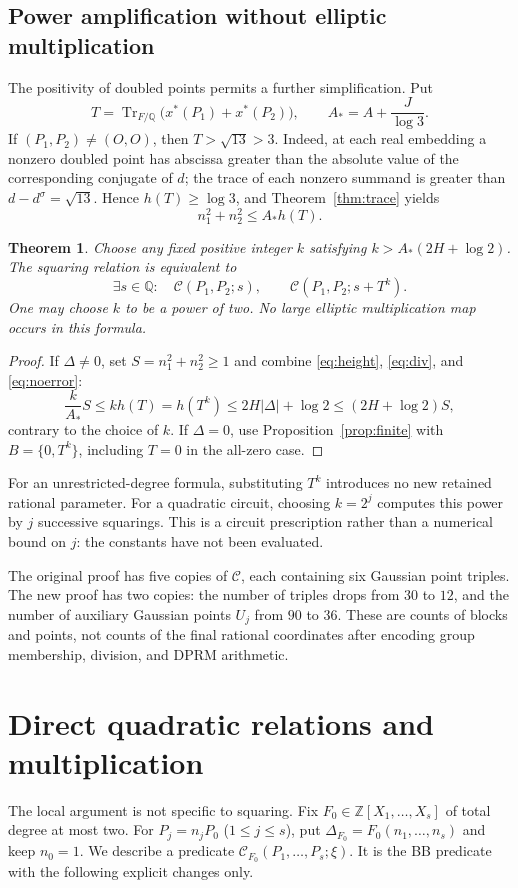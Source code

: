 \documentclass[11pt,a4paper]{article}
\newtheorem{theorem}{Theorem}[section]
\newcommand{\Q}{\mathbb Q}\newcommand{\Z}{\mathbb Z}
\DeclareMathOperator{\Tr}{Tr}\DeclareMathOperator{\Num}{Num}
\begin{document}
\subsection{Power amplification without elliptic multiplication}
The positivity of doubled points permits a further simplification.
Put
\[
 T=\Tr_{F/\Q}\bigl(x^*(P_1)+x^*(P_2)\bigr),\qquad
 A_*=A+\frac{J}{\log3}.
\]
If $(P_1,P_2)\ne(O,O)$, then $T>\sqrt{13}>3$. Indeed, at
each real embedding a nonzero doubled point has abscissa greater
than the absolute value of the corresponding conjugate of $d$;
the trace of each nonzero summand is greater than
$d-d^\sigma=\sqrt{13}$. Hence $h(T)\ge\log3$, and
Theorem~\ref{thm:trace} yields
\begin{equation}\label{eq:noerror}
 n_1^2+n_2^2\le A_* h(T).
\end{equation}

\begin{theorem}\label{thm:power}
Choose any fixed positive integer $k$ satisfying
$k>A_*(2H+\log2)$. The squaring relation is equivalent to
\[
 \exists s\in\Q:\quad
 \mathcal C(P_1,P_2;s),\qquad
 \mathcal C(P_1,P_2;s+T^k).
\]
One may choose $k$ to be a power of two. No large elliptic
multiplication map occurs in this formula.
\end{theorem}
\begin{proof}
If $\Delta\ne0$, set $S=n_1^2+n_2^2\ge1$ and combine
\eqref{eq:height}, \eqref{eq:div}, and \eqref{eq:noerror}:
\[
 \frac{k}{A_*}S\le k h(T)=h(T^k)
 \le 2H|\Delta|+\log2\le(2H+\log2)S,
\]
contrary to the choice of $k$. If $\Delta=0$, use
Proposition~\ref{prop:finite} with $B=\{0,T^k\}$, including
$T=0$ in the all-zero case.
\end{proof}

For an unrestricted-degree formula, substituting $T^k$ introduces
no new retained rational parameter. For a quadratic circuit,
choosing $k=2^j$ computes this power by $j$ successive squarings.
This is a circuit prescription rather than a numerical bound on $j$:
the constants have not been evaluated.

The original proof has five copies of $\mathcal C$, each containing
six Gaussian point triples. The new proof has two copies: the number
of triples drops from $30$ to $12$, and the number of auxiliary
Gaussian points $U_j$ from $90$ to $36$. These are counts of blocks
and points, not counts of the final rational coordinates after
encoding group membership, division, and DPRM arithmetic.

\section{Direct quadratic relations and multiplication}
The local argument is not specific to squaring. Fix
$F_0\in\Z[X_1,\ldots,X_s]$ of total degree at most two. For
$P_j=n_jP_0$ ($1\le j\le s$), put
$\Delta_{F_0}=F_0(n_1,\ldots,n_s)$ and keep $n_0=1$.
We describe a predicate $\mathcal C_{F_0}(P_1,\ldots,P_s;\xi)$.
It is the BB predicate with the following explicit changes only.
\end{document}
